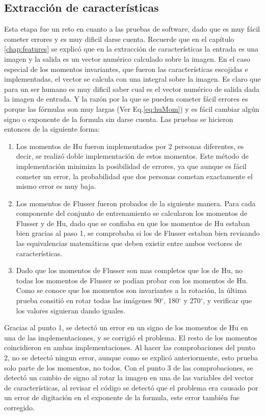 \documentclass[a4paper, 11pt, oneside]{report}
\begin{document}
\subsection{Extracción de características}
Esta etapa fue un reto en cuanto a las pruebas de software, dado que es muy fácil cometer errores y es muy dificil darse cuenta. Recuerde que en el capítulo \ref{chap:features} se explicó que en la extracción de características la entrada es una imagen y la salida es un vector numérico calculado sobre la imagen. En el caso especial de los momentos invariantes, que fueron las características escojidas e implementadas, el vector se calcula con una integral sobre la imagen.\newline \newline
Es claro que para un ser humano es muy dificil saber cual es el vector numérico de salida dada la imagen de entrada. Y la razón por la que se pueden cometer fácil errores es porque las fórmulas son muy largas (Ver Eq.\ref{eq:huMom}) y es fácil cambiar algún signo o exponente de la formula sin darse cuenta. Las pruebas se hicieron entonces de la siguiente forma:
\begin{enumerate}
\item Los momentos de Hu fueron implementados por 2 personas diferentes, es decir, se realizó doble implementación de estos momentos. Este método de implementación minimiza la posibilidad de errores, ya que aunque es fácil cometer un error, la probabilidad que dos personas cometan exactamente el mismo error es muy baja.
\item Los momentos de Flusser fueron probados de la siguiente manera. Para cada componente del conjunto de entrenamiento se calcularon los momentos de Flusser y de Hu, dado que se confiaba en que los momentos de Hu estaban bien gracias al paso 1, se comprobaba si los de Flusser estaban bien revisando las equivalencias matemáticas que deben existir entre ambos vectores de características.
\item Dado que los momentos de Flusser son mas completos que los de Hu, no todas los momentos de Flusser se podían probar con los momentos de Hu. Como se conoce que los momentos son invariantes a la rotación, la última prueba consitió en rotar todas las imágenes 90$^\circ$, 180$^\circ$ y 270$^\circ$, y verificar que los valores siguieran dando iguales.
\end{enumerate}
Gracias al punto 1, se detectó un error en un signo de los momentos de Hu en una de las implementaciones, y se corrigió el problema. El resto de los momentos coincidieron en ambas implementaciones. Al hacer las comprobaciones del punto 2, no se detectó ningun error, aunque como se explicó anteriormente, esto prueba solo parte de los momentos, no todos. Con el punto 3 de las comprobaciones, se detectó un cambio de signo al rotar la imagen en una de las variables del vector de características, al revisar el código se detectó que el problema era causado por un error de digitación en el exponente de la formula, este error también fue corregido.
\end{document}
